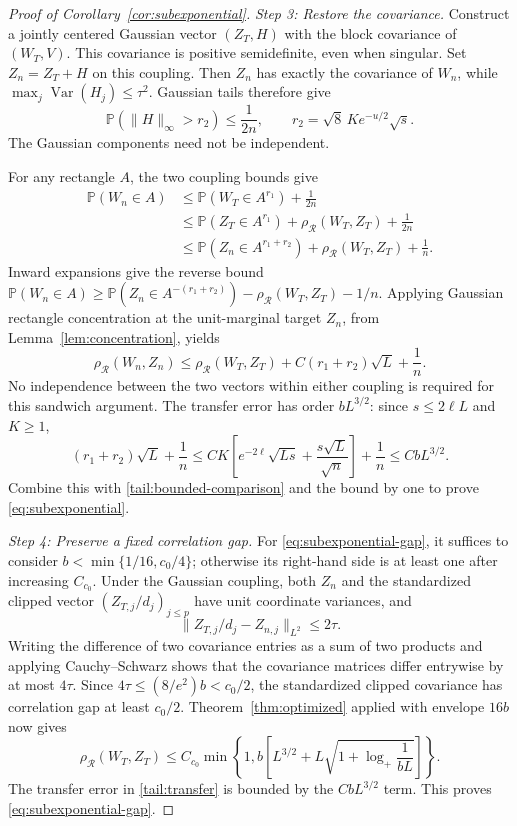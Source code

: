 \documentclass[11pt,letterpaper]{article}
\theoremstyle{remark}
\newcommand{\Pp}{\mathbb P}
\newcommand{\Var}{\operatorname{Var}}
\newcommand{\rh}{\rho_{\mathcal R}}
\begin{document}
\begin{proof}[Proof of Corollary~\ref{cor:subexponential}]
\emph{Step 3: Restore the covariance.}
Construct a jointly centered Gaussian vector \((Z_T,H)\) with the
block covariance of \((W_T,V)\). This covariance is positive
semidefinite, even when singular. Set \(Z_n=Z_T+H\) on this coupling.
Then \(Z_n\) has exactly the covariance of \(W_n\), while
\(\max_j\Var(H_j)\le\tau^2\). Gaussian tails therefore give
\begin{equation}
 \Pp(\|H\|_\infty>r_2)\le\frac1{2n},\qquad
 r_2=\sqrt8\,Ke^{-u/2}\sqrt s.
 \label{tail:Gaussian-coupling}
\end{equation}
The Gaussian components need not be independent.

For any rectangle \(A\), the two coupling bounds give
\begin{align*}
 \Pp(W_n\in A)
 &\le\Pp(W_T\in A^{r_1})+\frac1{2n}\\
 &\le\Pp(Z_T\in A^{r_1})+\rh(W_T,Z_T)+\frac1{2n}\\
 &\le\Pp(Z_n\in A^{r_1+r_2})+\rh(W_T,Z_T)+\frac1n.
\end{align*}
Inward expansions give the reverse bound
\(\Pp(W_n\in A)\ge\Pp(Z_n\in A^{-(r_1+r_2)})
-\rh(W_T,Z_T)-1/n\). Applying Gaussian rectangle concentration at
the unit-marginal target \(Z_n\), from Lemma~\ref{lem:concentration}, yields
\begin{equation}
 \rh(W_n,Z_n)\le\rh(W_T,Z_T)
       +C(r_1+r_2)\sqrt L+\frac1n.
 \label{tail:transfer}
\end{equation}
No independence between the two vectors within either coupling is
required for this sandwich argument.
The transfer error has order \(bL^{3/2}\): since
\(s\le2\ell L\) and \(K\ge1\),
\[
 (r_1+r_2)\sqrt L+\frac1n
 \le CK\left[e^{-2\ell}\sqrt{Ls}
                     +\frac{s\sqrt L}{\sqrt n}\right]+\frac1n
 \le CbL^{3/2}.
\]
Combine this with \eqref{tail:bounded-comparison} and the bound by one
to prove \eqref{eq:subexponential}.

\emph{Step 4: Preserve a fixed correlation gap.}
For \eqref{eq:subexponential-gap}, it suffices to consider
\(b<\min\{1/16,c_0/4\}\); otherwise its right-hand side is at
least one after increasing \(C_{c_0}\).
Under the Gaussian coupling, both \(Z_n\) and the standardized clipped
vector \((Z_{T,j}/d_j)_{j\le p}\) have unit coordinate variances, and
\[
 \|Z_{T,j}/d_j-Z_{n,j}\|_{L^2}\le2\tau.
\]
Writing the difference of two covariance entries as a sum of two
products and applying Cauchy--Schwarz shows that the covariance matrices
differ entrywise by at most \(4\tau\). Since
\(4\tau\le(8/e^2)b<c_0/2\), the standardized clipped covariance
has correlation gap at least \(c_0/2\).
Theorem~\ref{thm:optimized} applied with envelope \(16b\) now gives
\[
 \rh(W_T,Z_T)\le C_{c_0}\min\left\{1,
 b\left[L^{3/2}+L\sqrt{1+\log_+\frac1{bL}}\right]\right\}.
\]
The transfer error in \eqref{tail:transfer} is bounded by the
\(CbL^{3/2}\) term. This proves \eqref{eq:subexponential-gap}.
\end{proof}
\end{document}
